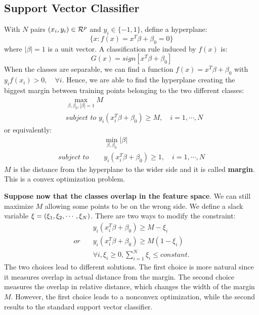 \documentclass[12pt, letterpaper]{article}
\theoremstyle{definition}
\DeclarePairedDelimiter\autobracket{(}{)}
\newcommand{\br}[1]{\autobracket*{#1}}
\begin{document}
\subsection{Support Vector Classifier}
With $N$ pairs $(x_i, y_i) \in \CMcal{R}^p$ and $y_i \in \{-1, 1\}$, define a hyperplane:
\begin{equation}
\{x: f(x) = x^T\beta+ \beta_0=0\}
\end{equation}
where $\left|\beta\right|=1$ is a unit vector. A classification rule induced by $f(x)$ is:
\begin{equation}
G(x) = sign\left[x^T\beta+\beta_0\right]
\end{equation}
When the classes are separable, we can find a function $f(x)=x^T\beta+\beta_0$ with $y_if(x_i)>0, \quad \forall i$. Hence, we are able to find the hyperplane creating the biggest margin between training points belonging to the two different classes:
\begin{equation}
\begin{aligned}
&\max_{\beta, \beta_0,\left|\beta\right|=1} M\\
&\textit{subject to } y_i(x_i^T\beta+\beta_0)\ge M,\quad i=1,\cdots,N
\end{aligned}
\end{equation}
or equivalently:
\begin{equation}
\begin{aligned}
&\min_{\beta, \beta_0} \left|\beta\right|\\
\textit{subject to } \quad&y_i(x_i^T\beta+\beta_0)\ge 1,\quad i=1,\cdots,N
\end{aligned}
\end{equation}
$M$ is the distance from the hyperplane to the wider side and it is called \textbf{margin}. This is a convex optimization problem.

\textbf{Suppose now that the classes overlap in the feature space}. We can still maximize $M$ allowing some points to be on the wrong side. We define a slack variable $\xi=\br{\xi_1, \xi_2, \cdots, \xi_N}$. There are two ways to modify the constraint:
\begin{equation}
\begin{aligned}
&y_i (x_i^T\beta+\beta_0)\ge M -\xi_i\\
\textit{or} \quad&y_i (x_i^T\beta+\beta_0)\ge M (1-\xi_i)\\
&\forall i, \xi_i\ge  0, \sum_{i=1}^N \xi_i \le constant.
\end{aligned}
\end{equation}
The two choices lead to different solutions. The first choice is more natural since it measures overlap in actual distance from the margin. The second choice measures the overlap in relative distance, which changes the width of the margin $M$. However, the first choice leads to a nonconvex optimization, while the second results to the standard support vector classifier. 
\end{document}
